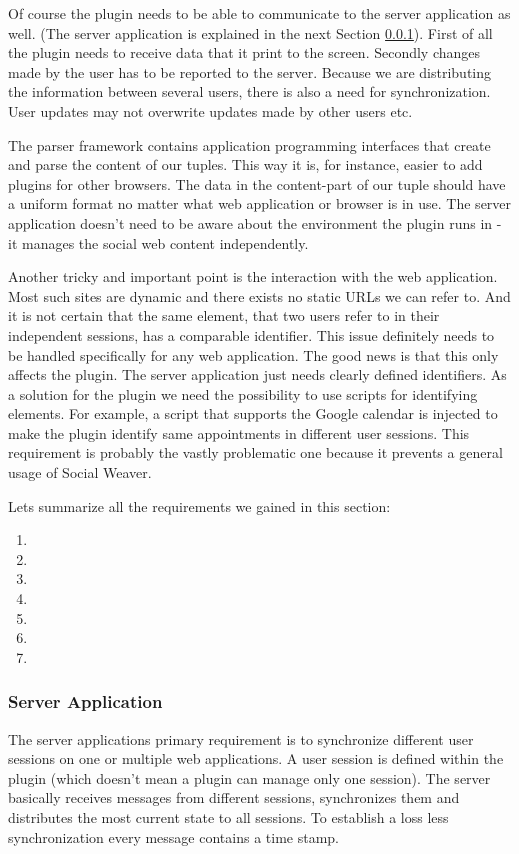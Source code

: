 Of course the plugin needs to be able to communicate to the server application as well. (The server application is explained in the next Section \ref{Social Weaver - Server Application}). First of all the plugin needs to receive data that it print to the screen. Secondly changes made by the user has to be reported to the server. Because we are distributing the information between several users, there is also a need for synchronization. User updates may not overwrite updates made by other users etc.

The parser framework contains application programming interfaces that create and parse the content of our tuples. This way it is, for instance, easier to add plugins for other browsers. 
The data in the content-part of our tuple should have a uniform format no matter what web application or browser is in use. The server application doesn't need to be aware about the environment the plugin runs in - it manages the social web content independently.

Another tricky and important point is the interaction with the web application. Most such sites are dynamic and there exists no static URLs we can refer to. And it is not certain that the same element, that two users refer to in their independent sessions, has a comparable identifier. This issue definitely needs to be handled specifically for any web application. The good news is that this only affects the plugin. The server application just needs clearly defined identifiers. As a solution for the plugin we need the possibility to use scripts for identifying elements. For example, a script that supports the Google calendar is injected to make the plugin identify same appointments in different user sessions. This requirement is probably the vastly problematic one because it prevents a general usage of Social Weaver.

Lets summarize all the requirements we gained in this section:

\begin{enumerate}
\item \reqPi
\item \reqPii
\item \reqPiii
\item \reqPiv
\item \reqPv
\item \reqPvi
\item \reqPvii
\end{enumerate}

\subsubsection{Server Application} \label{Social Weaver - Server Application}
The server applications primary requirement is to synchronize different user sessions on one or multiple web applications. A user session is defined within the plugin (which doesn't mean a plugin can manage only one session). The server basically receives messages from different sessions, synchronizes them and distributes the most current state to all sessions.  To establish a loss less synchronization every message contains a time stamp.

